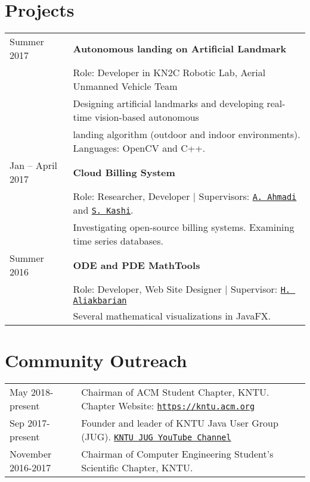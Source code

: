 \documentclass[letterpaper]{article}
\begin{document}
{{{\begin{tabular}{l l}
\end{tabular}

\section*{Projects}

{\renewcommand{\arraystretch}{1.2}
\begin{tabular}{l l}
Summer 2017 & \textbf{Autonomous landing on Artificial Landmark} \\ & Role: Developer in KN2C Robotic Lab, Aerial Unmanned Vehicle Team \\&Designing artificial landmarks and developing real-time vision-based autonomous \\& landing algorithm (outdoor and indoor environments). Languages: OpenCV and C++.
\\
Jan – April 2017 & \textbf{Cloud Billing System} \\& Role: Researcher, Developer | Supervisors: \href{http://wp.kntu.ac.ir/ahmadi/}{\tt A. Ahmadi} and \href{http://wp.kntu.ac.ir/sedighian/}{\tt  S. Kashi}.
\\&
Investigating open-source billing systems. Examining time series databases.
\\
Summer 2016 &  \textbf{ODE and PDE MathTools} \\&
Role: Developer, Web Site Designer | Supervisor: \href{http://wp.kntu.ac.ir/aliakbarian/}{\tt H. Aliakbarian} \\&
Several mathematical visualizations in JavaFX.

\end{tabular}

\section*{Community Outreach}

{\renewcommand{\arraystretch}{1.2}
\begin{tabular}{l l}
May 2018-present & Chairman of ACM Student Chapter, KNTU. Chapter Website: \href{https://kntu.acm.org}{\tt https://kntu.acm.org} 
\\
Sep 2017-present & Founder and leader of KNTU Java User Group (JUG). \href{https://www.youtube.com/channel/UCIZWx5W3uNAKI4ggooa7qNA}{\tt KNTU JUG YouTube Channel} 
\\
November 2016-2017 & Chairman of Computer Engineering Student's Scientific Chapter, KNTU.
\end{tabular}

}}}}}
\end{document}
